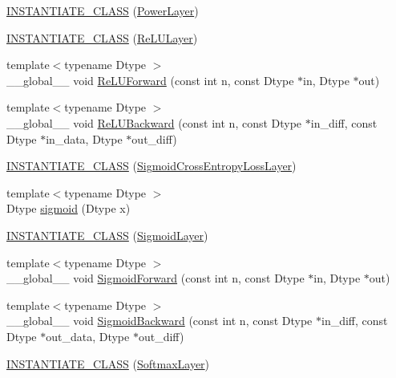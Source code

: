 \begin{DoxyCompactItemize}
\item 
\hyperlink{namespacecaffe_afc43e6d359620a8c571275f7d75c6a4c}{I\+N\+S\+T\+A\+N\+T\+I\+A\+T\+E\+\_\+\+C\+L\+A\+S\+S} (\hyperlink{classcaffe_1_1_power_layer}{Power\+Layer})
\item 
\hyperlink{namespacecaffe_a889d40ff9d35d8cdcf75089259d4ada0}{I\+N\+S\+T\+A\+N\+T\+I\+A\+T\+E\+\_\+\+C\+L\+A\+S\+S} (\hyperlink{classcaffe_1_1_re_l_u_layer}{Re\+L\+U\+Layer})
\item 
{\footnotesize template$<$typename Dtype $>$ }\\\+\_\+\+\_\+global\+\_\+\+\_\+ void \hyperlink{namespacecaffe_ac5ca8087a73d4ccc045d858440c8c61d}{Re\+L\+U\+Forward} (const int n, const Dtype $\ast$in, Dtype $\ast$out)
\item 
{\footnotesize template$<$typename Dtype $>$ }\\\+\_\+\+\_\+global\+\_\+\+\_\+ void \hyperlink{namespacecaffe_af33d9be2073b5cbc8b5a301d225bd837}{Re\+L\+U\+Backward} (const int n, const Dtype $\ast$in\+\_\+diff, const Dtype $\ast$in\+\_\+data, Dtype $\ast$out\+\_\+diff)
\item 
\hyperlink{namespacecaffe_a8cf0d0032a97f7af35c6ab76023160cd}{I\+N\+S\+T\+A\+N\+T\+I\+A\+T\+E\+\_\+\+C\+L\+A\+S\+S} (\hyperlink{classcaffe_1_1_sigmoid_cross_entropy_loss_layer}{Sigmoid\+Cross\+Entropy\+Loss\+Layer})
\item 
{\footnotesize template$<$typename Dtype $>$ }\\Dtype \hyperlink{namespacecaffe_a09950f2e1819d3f30dec69bbb8e404a1}{sigmoid} (Dtype x)
\item 
\hyperlink{namespacecaffe_ae153024d4b24c9c45f986ae3974cc6b7}{I\+N\+S\+T\+A\+N\+T\+I\+A\+T\+E\+\_\+\+C\+L\+A\+S\+S} (\hyperlink{classcaffe_1_1_sigmoid_layer}{Sigmoid\+Layer})
\item 
{\footnotesize template$<$typename Dtype $>$ }\\\+\_\+\+\_\+global\+\_\+\+\_\+ void \hyperlink{namespacecaffe_a630ac77e09451de2f8b1e06905be90a7}{Sigmoid\+Forward} (const int n, const Dtype $\ast$in, Dtype $\ast$out)
\item 
{\footnotesize template$<$typename Dtype $>$ }\\\+\_\+\+\_\+global\+\_\+\+\_\+ void \hyperlink{namespacecaffe_a0da539f774d82bac493b76b0232d7a0d}{Sigmoid\+Backward} (const int n, const Dtype $\ast$in\+\_\+diff, const Dtype $\ast$out\+\_\+data, Dtype $\ast$out\+\_\+diff)
\item 
\hyperlink{namespacecaffe_a6fa6fe4a2398b265fe5ca12997afbb38}{I\+N\+S\+T\+A\+N\+T\+I\+A\+T\+E\+\_\+\+C\+L\+A\+S\+S} (\hyperlink{classcaffe_1_1_softmax_layer}{Softmax\+Layer})

\end{DoxyCompactItemize}
